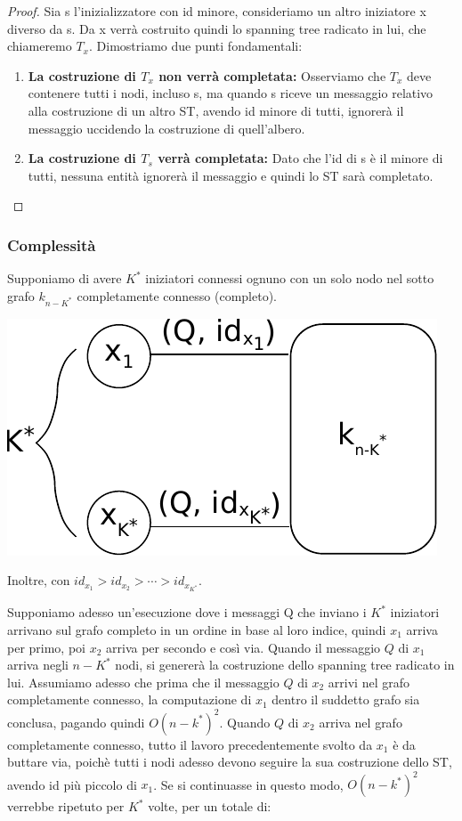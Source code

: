 \begin{proof}
Sia s l'inizializzatore con id minore, consideriamo un altro iniziatore x diverso da s.
Da x verrà costruito quindi lo spanning tree radicato in lui, che chiameremo $T_x$. Dimostriamo due punti fondamentali:
\begin{enumerate}
    \item \textbf{La costruzione di $T_x$ non verrà completata:} Osserviamo che $T_x$ deve contenere tutti i nodi, incluso s, ma quando s riceve un messaggio relativo alla costruzione di un altro ST, avendo id minore di tutti, ignorerà il messaggio uccidendo la costruzione di quell'albero.
    \item \textbf{La costruzione di $T_s$ verrà completata:} Dato che l'id di s è il minore di tutti, nessuna entità ignorerà il messaggio e quindi lo ST sarà completato.
\end{enumerate}
\end{proof}

\subsubsection{Complessità}
Supponiamo di avere $K^*$ iniziatori connessi ognuno con un solo nodo nel sotto grafo $k_{n-K^*}$ completamente connesso (completo).
\begin{center}
  \includegraphics[scale=0.9]{images/n_39}
\end{center}
Inoltre, con $id_{x_1} > id_{x_2} > \cdots > id_{x_{K^*}}$.

Supponiamo adesso un'esecuzione dove i messaggi Q che inviano i $K^*$ iniziatori arrivano sul grafo completo in un ordine in base al loro indice, quindi $x_1$ arriva per primo, poi $x_2$ arriva per secondo e così via. Quando il messaggio $Q$ di $x_1$ arriva negli $n-K^*$ nodi, si genererà la costruzione dello spanning tree radicato in lui. Assumiamo adesso che prima che il messaggio $Q$ di $x_2$ arrivi nel grafo completamente connesso, la computazione di $x_1$ dentro il suddetto grafo sia conclusa, pagando quindi $O(n-k^*)^2$. Quando $Q$ di $x_2$ arriva nel grafo completamente connesso, tutto il lavoro precedentemente svolto da $x_1$ è da buttare via, poichè tutti i nodi adesso devono seguire la sua costruzione dello ST, avendo id più piccolo di $x_1$. Se si continuasse in questo modo, $O(n-k^*)^2$ verrebbe ripetuto per $K^*$ volte, per un totale di:

